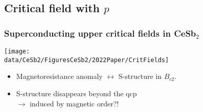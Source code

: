 \subsection{Critical field with $p$}
\begin{frame}[label=CriticalFields]
\frametitle{Superconducting upper critical fields in CeSb$_2$}

\centerline{\texttt{[image: \\data/CeSb2/FiguresCeSb2/2022Paper/CritFields]}}

%
\begin{itemize}
\item Magnetoresistance anomaly $\leftrightarrow$ S-structure in $B_{c2}$.
\item S-structure disappears beyond the qcp \\ \raggedleft $\rightarrow$ induced by magnetic order?! %

\end{itemize}

\end{frame}





